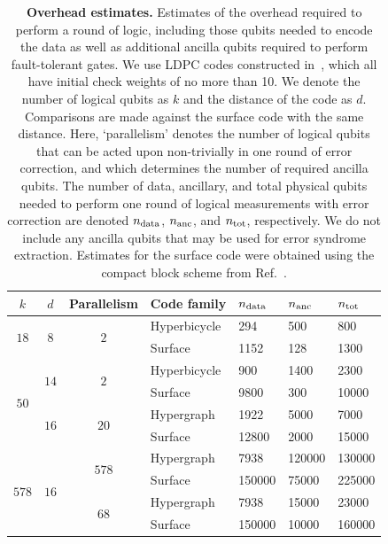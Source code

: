 \documentclass[reprint,
superscriptaddress,
 amsmath,amssymb,
 aps, longbibliography
]{revtex4-1}
\newcommand{\rev}[1]{{#1}}
\begin{document}
\begin{table}
    \centering
    \begin{tabular}{||c|c|c|m{7em}<{\centering}|m{4em}<{\centering}|m{4em}<{\centering}|m{4em}<{\centering}||}
        \hline
        $k$ & $d$ & Parallelism & Code family & $n_{\rm data}$ & $n_{\rm anc}$ & $n_{\rm tot}$\\
        \hline
        \hline
        \multirow{2}{2em}{\centering $18$} & \multirow{2}{2em}{\centering $8$} & \multirow{2}{*}{$2$} & Hyperbicycle & 294 & 500 & 800 \\
        & & & Surface & 1152 & 128 & 1300 \\
        \hline
        \multirow{4}{*}{$50$} & \multirow{2}{*}{\hfil $14$} & \multirow{2}{*}{$2$} & Hyperbicycle  & 900 & 1400 & 2300 \\
        & & & Surface  & 9800 & 300 & 10000 \\
        \cline{2-7}
        & \multirow{2}{*}{\hfil $16$} & \multirow{2}{*}{$20$} & Hypergraph & 1922 & 5000 & 7000 \\
        & & & Surface & 12800 & 2000 & 15000 \\
        \hline 
        \multirow{4}{*}{\hfil $578$} & \multirow{4}{*}{\hfil $16$} & \multirow{2}{*}{$578$} & Hypergraph & 7938 & 120000 & 130000 \\
        & & & Surface & 150000 & 75000 & 225000 \\
        \cline{3-7}
        & & \multirow{2}{*}{$68$} & Hypergraph & 7938 & 15000 & 23000 \\
        & & & Surface & 150000 & 10000 & 160000 \\
        \hline
    \end{tabular}
    \caption{\textbf{Overhead estimates.}  Estimates of the overhead required to perform a round of logic, including those qubits needed to encode the data as well as additional ancilla qubits required to perform fault-tolerant gates. We use LDPC codes constructed in~\cite{Panteleev19, Kovalev2013}, which all have initial check weights of no more than 10. We denote the number of logical qubits as $k$ and the distance of the code as $d$. Comparisons are made against the surface code with the same distance.  Here, `parallelism' denotes the number of logical qubits that can be acted upon non-trivially in one round of error correction, and which determines the number of required ancilla qubits.  The number of data, ancillary, and total physical qubits needed to perform one round of logical measurements with error correction are denoted $n_{\rm data}$, $n_{\rm anc}$, and $n_{\rm tot}$, respectively. We do not include any ancilla qubits that may be used for error syndrome extraction. \rev{Estimates for the surface code were obtained using the compact block scheme from Ref.~\cite{Litinski19}.} }
    \label{tab:results}
\end{table}
\end{document}
